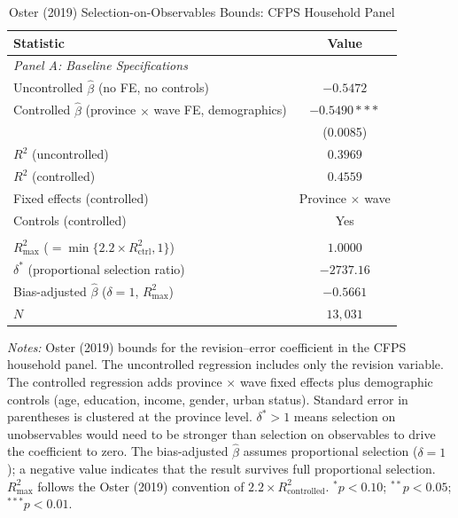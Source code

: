 \begin{table}[htbp]
\centering
\begin{threeparttable}
\caption{Oster (2019) Selection-on-Observables Bounds: CFPS Household Panel}
\label{tab:oster_bounds}
{\small
\begin{tabular}{lc}
\toprule
Statistic & Value \\
\midrule
\multicolumn{2}{l}{\textit{Panel A: Baseline Specifications}} \\
\addlinespace
Uncontrolled $\hat{\beta}$ (no FE, no controls) & $-0.5472$ \\
Controlled $\hat{\beta}$ (province $\times$ wave FE, demographics) & $-0.5490***$ \\
 & (0.0085) \\
\addlinespace
$R^{2}$ (uncontrolled) & $0.3969$ \\
$R^{2}$ (controlled) & $0.4559$ \\
Fixed effects (controlled) & Province $\times$ wave \\
Controls (controlled) & Yes \\
\addlinespace
\multicolumn{2}{l}{\textit{Panel B: Oster Bounds}} \\
\addlinespace
$R^2_{\max}$ ($= \min\{2.2 \times R^2_{\text{ctrl}}, 1\}$) & $1.0000$ \\
$\delta^*$ (proportional selection ratio) & $-2737.16$ \\
Bias-adjusted $\hat{\beta}$ ($\delta = 1$, $R^2_{\max}$) & $-0.5661$ \\
$N$ & $13,031$ \\
\bottomrule
\end{tabular}
}
\begin{tablenotes}[flushleft]
\footnotesize
\item \textit{Notes:} Oster (2019) bounds for the revision--error coefficient in the CFPS household panel. The uncontrolled regression includes only the revision variable. The controlled regression adds province $\times$ wave fixed effects plus demographic controls (age, education, income, gender, urban status). Standard error in parentheses is clustered at the province level. $\delta^* > 1$ means selection on unobservables would need to be stronger than selection on observables to drive the coefficient to zero. The bias-adjusted $\hat{\beta}$ assumes proportional selection ($\delta = 1$); a negative value indicates that the result survives full proportional selection. $R^2_{\max}$ follows the Oster (2019) convention of $2.2 \times R^2_{\text{controlled}}$. $^{*}p<0.10$; $^{**}p<0.05$; $^{***}p<0.01$.
\end{tablenotes}
\end{threeparttable}
\end{table}
